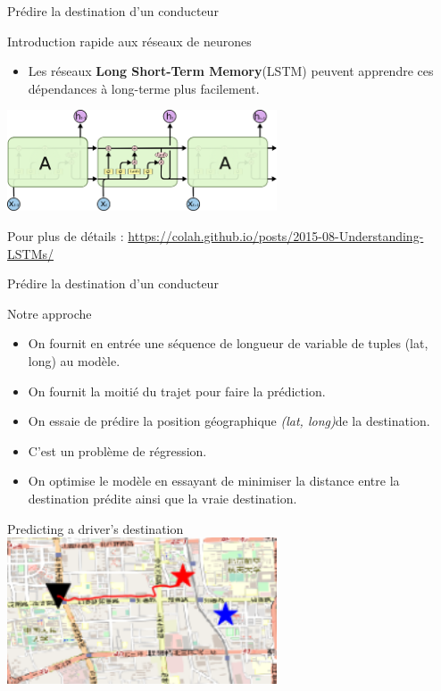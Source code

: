 \documentclass[aspectratio=169]{beamer}
\begin{document}
\begin{frame}{Prédire la destination d'un conducteur}

{\Large Introduction rapide aux réseaux de neurones}

\begin{itemize}
	\item Les réseaux \textbf{Long Short-Term Memory}(LSTM) peuvent apprendre ces dépendances à long-terme plus facilement.
\end{itemize}
\centering
\includegraphics[width=0.6\textwidth]{figures/lstm}

Pour plus de détails : \url{https://colah.github.io/posts/2015-08-Understanding-LSTMs/}

\end{frame}

\begin{frame}{Prédire la destination d'un conducteur}

{\Large Notre approche}

\begin{itemize}
	\item On fournit en entrée une séquence de longueur de variable de tuples (lat, long) au modèle.
	\item On fournit la moitié du trajet pour faire la prédiction.
	\item On essaie de prédire la position géographique \textit{(lat, long)}de la destination.
	\item C'est un problème de régression.
	\item On optimise le modèle en essayant de minimiser la distance entre la destination prédite ainsi que la vraie destination.
\end{itemize}
\end{frame}

\begin{frame}{Predicting a driver's destination}
\centering
\includegraphics[width=0.6\textwidth]{figures/ex1_reg}
\end{frame}
\end{document}
